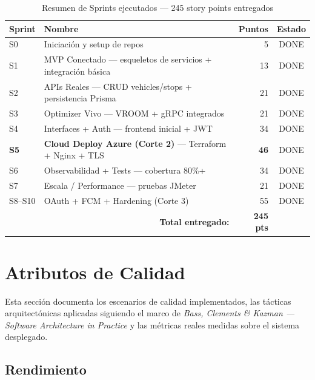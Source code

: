 \documentclass[12pt,a4paper,oneside]{article}
\begin{document}
\begin{table}[H]
\centering
\caption{Resumen de Sprints ejecutados --- 245 story points entregados}
\label{tab:sprints-resumen}
\small
\begin{tabularx}{\textwidth}{l X r c}
\toprule
\textbf{Sprint} & \textbf{Nombre} & \textbf{Puntos} & \textbf{Estado} \\
\midrule
S0 & Iniciaci\'on y setup de repos & 5 & DONE \\
S1 & MVP Conectado --- esqueletos de servicios + integraci\'on b\'asica & 13 & DONE \\
S2 & APIs Reales --- CRUD vehicles/stops + persistencia Prisma & 21 & DONE \\
S3 & Optimizer Vivo --- VROOM + gRPC integrados & 21 & DONE \\
S4 & Interfaces + Auth --- frontend inicial + JWT & 34 & DONE \\
\textbf{S5} & \textbf{Cloud Deploy Azure (Corte 2)} --- Terraform + Nginx + TLS & \textbf{46} & DONE \\
S6 & Observabilidad + Tests --- cobertura 80\%+ & 34 & DONE \\
S7 & Escala / Performance --- pruebas JMeter & 21 & DONE \\
S8--S10 & OAuth + FCM + Hardening (Corte 3) & 55 & DONE \\
\midrule
\multicolumn{2}{r}{\textbf{Total entregado:}} & \textbf{245 pts} & \\
\bottomrule
\end{tabularx}
\end{table}

\section{Atributos de Calidad}

Esta secci\'on documenta los escenarios de calidad implementados, las t\'acticas arquitect\'onicas aplicadas siguiendo el marco de \emph{Bass, Clements \& Kazman --- Software Architecture in Practice} y las m\'etricas reales medidas sobre el sistema desplegado.

\subsection{Rendimiento}
\end{document}
